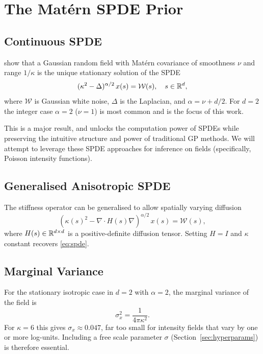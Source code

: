 \documentclass[11pt]{article}
\begin{document}
\section{The Mat\'ern SPDE Prior}

\subsection{Continuous SPDE}

\citet{lindgren2011} show that a Gaussian random field with Mat\'ern covariance
of smoothness $\nu$ and range $1/\kappa$ is the unique stationary solution of the
SPDE
\begin{equation}
  (\kappa^2 - \Delta)^{\alpha/2} \, x(s) = \mathcal{W}(s), \quad s \in \mathbb{R}^d,
  \label{eq:spde}
\end{equation}
where $\mathcal{W}$ is Gaussian white noise, $\Delta$ is the Laplacian, and
$\alpha = \nu + d/2$.  For $d=2$ the integer case $\alpha=2$ ($\nu=1$) is most
common and is the focus of this work.

This is a major result, and unlocks the computation power of SPDEs while preserving the intuitive structure and power of traditional GP methods. We will attempt to leverage these SPDE approaches for inference on fields (specifically, Poisson intensity functions). 

\subsection{Generalised Anisotropic SPDE}

The stiffness operator can be generalised to allow spatially varying diffusion
\begin{equation}
  (\kappa(s)^2 - \nabla \cdot H(s) \nabla)^{\alpha/2} \, x(s) = \mathcal{W}(s),
  \label{eq:spde-gen}
\end{equation}
where $H(s) \in \mathbb{R}^{d\times d}$ is a positive-definite diffusion tensor.
Setting $H = I$ and $\kappa$ constant recovers \eqref{eq:spde}.

\subsection{Marginal Variance}

For the stationary isotropic case in $d=2$ with $\alpha=2$, the marginal
variance of the field is
\begin{equation}
  \sigma_x^2 = \frac{1}{4\pi\kappa^2}.
  \label{eq:margvar}
\end{equation}
For $\kappa = 6$ this gives $\sigma_x \approx 0.047$, far too small for
intensity fields that vary by one or more log-units.  Including a free scale
parameter $\sigma$ (Section~\ref{sec:hyperparams}) is therefore essential.
\end{document}
